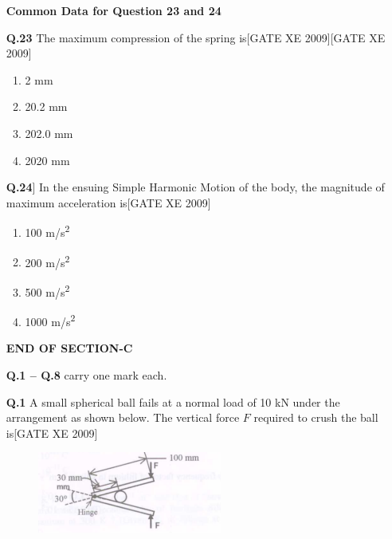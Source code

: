 \documentclass[journal,12pt,onecolumn]{IEEEtran}
\theoremstyle{remark}
\begin{document}
\begin{enumerate}
\vspace{0.3cm}

\textbf{Common Data for Question 23 and 24}

\item [\textbf{Q.23}] The maximum compression of the spring is\hfill[GATE XE 2009]\hfill[GATE XE 2009]
\begin{multicols}{2}
\begin{enumerate}
    \item 2 mm
    \item 20.2 mm
    \item 202.0 mm
    \item 2020 mm
\end{enumerate}
\end{multicols}

\vspace{0.3cm}

\item[] \textbf{Q.24}] In the ensuing Simple Harmonic Motion of the body, the magnitude of maximum acceleration is\hfill[GATE XE 2009]
\begin{multicols}{2}
\begin{enumerate}
    \item 100 m/s\textsuperscript{2}
    \item 200 m/s\textsuperscript{2}
    \item 500 m/s\textsuperscript{2}
    \item 1000 m/s\textsuperscript{2}
\end{enumerate}
\end{multicols}

\bigskip
\begin{center}
{\Large\textbf{END OF SECTION-C}}
\end{center}
\clearpage

\textbf{Q.1 -- Q.8} carry one mark each.

\vspace{1em}


\item[\textbf{Q.1}] A small spherical ball fails at a normal load of 10 kN under the arrangement as shown below. The vertical force $F$ required to crush the ball is\hfill[GATE XE 2009]
\begin{figure}[h]
    \centering
    \includegraphics[width=0.5\columnwidth]{figs/fig6.png}


\end{figure}
\end{enumerate}
\end{document}
